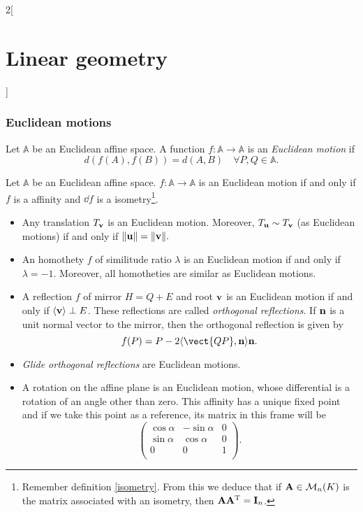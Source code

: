 \documentclass[../../../main.tex]{subfiles}
\begin{document}
\begin{multicols}{2}[\section{Linear geometry}]
    \subsubsection*{Euclidean motions}
    \label{LG-euclidean_motion}
    \begin{definition}
        Let $\mathbb{A}$ be an Euclidean affine space. A function $f:\mathbb{A}\rightarrow\mathbb{A}$ is an \textit{Euclidean motion} if $$d(f(A),f(B))=d(A,B)\quad\forall P,Q\in\mathbb{A}.$$
    \end{definition}
    \begin{prop}
        Let $\mathbb{A}$ be an Euclidean affine space. $f:\mathbb{A}\rightarrow\mathbb{A}$ is an Euclidean motion if and only if $f$ is a affinity and $\dd f$ is a isometry\footnote{Remember definition \ref{isometry}. From this we deduce that if $\vb{A}\in\mathcal{M}_n(K)$ is the matrix associated with an isometry, then $\vb{A}\vb{A}^{\mathrm{T}}=\vb{I}_n$.}.
    \end{prop}
    \begin{prop}
        \hfill
        \begin{itemize}
            \item Any translation $T_{\vb{v}}$ is an Euclidean motion. Moreover, $T_{\vb{u}}\sim T_{\vb{v}}$ (as Euclidean motions) if and only if $\|\vb{u}\|=\|\vb{v}\|.$
            \item An homothety $f$ of similitude ratio $\lambda$ is an Euclidean motion if and only if $\lambda=-1$. Moreover, all homotheties are similar as Euclidean motions.
            \item A reflection $f$ of mirror $H=Q+E$ and root $\vb{v}$ is an Euclidean motion if and only if $\langle\vb{v}\rangle\perp E$. These reflections are called \textit{orthogonal reflections}. If $\vb{n}$ is a unit normal vector to the mirror, then the orthogonal reflection is given by $$f(P)=P-2\langle\vect{QP},\mathblack{n}\rangle\mathblack{n}.$$
            \item \textit{Glide orthogonal reflections} are Euclidean motions.
            \item A rotation on the affine plane is an Euclidean motion, whose differential is a rotation of an angle other than zero. This affinity has a unique fixed point and if we take this point as a reference, its matrix in this frame will be $$\begin{pmatrix}
                          \cos\alpha & -\sin\alpha & 0 \\
                          \sin\alpha & \cos\alpha  & 0 \\
                          0          & 0           & 1 \\
                      \end{pmatrix}.$$
        \end{itemize}
    \end{prop}

\end{multicols}
\end{document}
